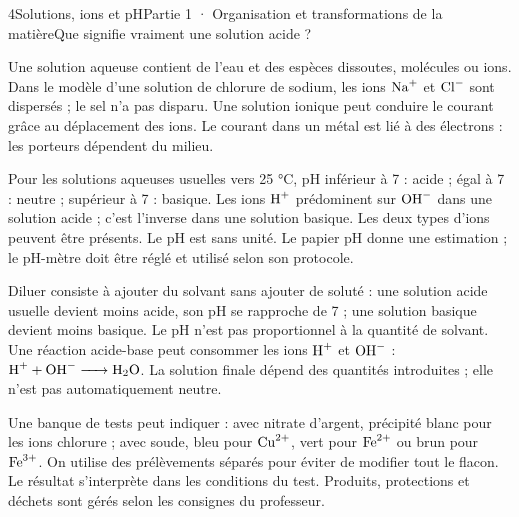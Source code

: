\begin{ouverture}[college1]{4}{Solutions, ions et pH}{Partie 1 · Organisation et transformations de la matière}{Que signifie vraiment une solution acide ?}
\end{ouverture}
\label{ess-4}
Une solution aqueuse contient de l’eau et des espèces dissoutes, molécules ou ions. Dans le modèle d’une solution de chlorure de sodium, les ions $\ce{Na+}$ et $\ce{Cl-}$ sont dispersés ; le sel n’a pas disparu. Une solution ionique peut conduire le courant grâce au déplacement des ions. Le courant dans un métal est lié à des électrons : les porteurs dépendent du milieu.\par
{}
Pour les solutions aqueuses usuelles vers 25 °C, pH inférieur à 7 : acide ; égal à 7 : neutre ; supérieur à 7 : basique. Les ions $\ce{H+}$ prédominent sur $\ce{OH-}$ dans une solution acide ; c’est l’inverse dans une solution basique. Les deux types d’ions peuvent être présents. Le pH est sans unité. Le papier pH donne une estimation ; le pH-mètre doit être réglé et utilisé selon son protocole.\par
\clearpage
{}
Diluer consiste à ajouter du solvant sans ajouter de soluté : une solution acide usuelle devient moins acide, son pH se rapproche de 7 ; une solution basique devient moins basique. Le pH n’est pas proportionnel à la quantité de solvant. Une réaction acide-base peut consommer les ions $\ce{H+}$ et $\ce{OH-}$ : $\ce{H+ + OH- -> H2O}$. La solution finale dépend des quantités introduites ; elle n’est pas automatiquement neutre.\par
{}
Une banque de tests peut indiquer : avec nitrate d’argent, précipité blanc pour les ions chlorure ; avec soude, bleu pour $\ce{Cu^{2+}}$, vert pour $\ce{Fe^{2+}}$ ou brun pour $\ce{Fe^{3+}}$. On utilise des prélèvements séparés pour éviter de modifier tout le flacon. Le résultat s’interprète dans les conditions du test. Produits, protections et déchets sont gérés selon les consignes du professeur.\par

